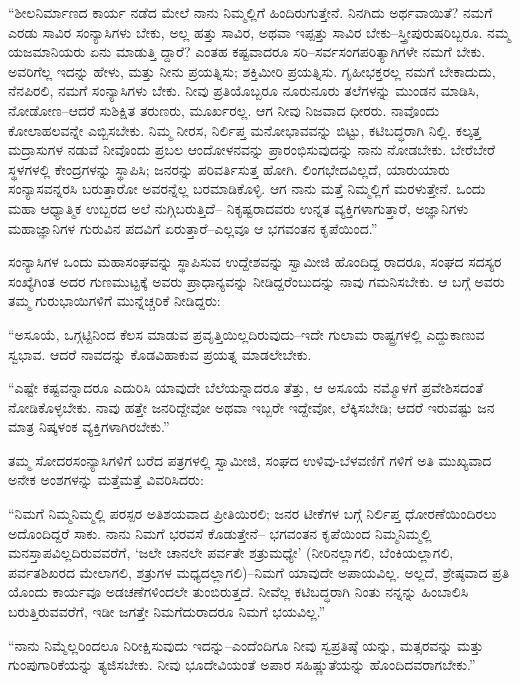 “ಶೀಲನಿರ್ಮಾಣದ ಕಾರ್ಯ ನಡೆದ ಮೇಲೆ ನಾನು ನಿಮ್ಮಲ್ಲಿಗೆ ಹಿಂದಿರುಗುತ್ತೇನೆ. ನಿನಗಿದು ಅರ್ಥವಾಯಿತೆ? ನಮಗೆ ಎರಡು ಸಾವಿರ ಸಂನ್ಯಾಸಿಗಳು ಬೇಕು, ಅಲ್ಲ ಹತ್ತು ಸಾವಿರ, ಅಥವಾ ಇಪ್ಪತ್ತು ಸಾವಿರ ಬೇಕು–ಸ್ತ್ರೀಪುರುಷರಿಬ್ಬರೂ. ನಮ್ಮ ಯಜಮಾನಿಯರು ಏನು ಮಾಡುತ್ತಿ ದ್ದಾರೆ? ಎಂತಹ ಕಷ್ಟವಾದರೂ ಸರಿ–ಸರ್ವಸಂಗಪರಿತ್ಯಾಗಿಗಳೇ ನಮಗೆ ಬೇಕು. ಅವರಿಗೆಲ್ಲ ಇದನ್ನು ಹೇಳು, ಮತ್ತು ನೀನು ಪ್ರಯತ್ನಿಸು; ಶಕ್ತಿಮೀರಿ ಪ್ರಯತ್ನಿಸು. ಗೃಹೀಭಕ್ತರಲ್ಲ ನಮಗೆ ಬೇಕಾದುದು, ನೆನಪಿರಲಿ, ನಮಗೆ ಸಂನ್ಯಾಸಿಗಳು ಬೇಕು. ನೀವು ಪ್ರತಿಯೊಬ್ಬರೂ ನೂರುನೂರು ತಲೆಗಳನ್ನು ಮುಂಡನ ಮಾಡಿಸಿ, ನೋಡೋಣ–ಆದರೆ ಸುಶಿಕ್ಷಿತ ತರುಣರು, ಮೂರ್ಖರಲ್ಲ. ಆಗ ನೀವು ನಿಜವಾದ ಧೀರರು. ನಾವೊಂದು ಕೋಲಾಹಲವನ್ನೇ ಎಬ್ಬಿಸಬೇಕು. ನಿಮ್ಮ ನೀರಸ, ನಿರ್ಲಿಪ್ತ ಮನೋಭಾವವನ್ನು ಬಿಟ್ಟು, ಕಟಿಬದ್ಧರಾಗಿ ನಿಲ್ಲಿ. ಕಲ್ಕತ್ತ ಮದ್ರಾಸುಗಳ ನಡುವೆ ನೀವೊಂದು ಪ್ರಬಲ ಆಂದೋಳನವನ್ನು ಪ್ರಾರಂಭಿಸುವುದನ್ನು ನಾನು ನೋಡಬೇಕು. ಬೇರೆಬೇರೆ ಸ್ಥಳಗಳಲ್ಲಿ ಕೇಂದ್ರಗಳನ್ನು ಸ್ಥಾಪಿಸಿ; ಜನರನ್ನು ಪರಿವರ್ತಿಸುತ್ತ ಹೋಗಿ. ಲಿಂಗಭೇದವಿಲ್ಲದೆ, ಯಾರುಯಾರು ಸಂನ್ಯಾಸವನ್ನರಸಿ ಬರುತ್ತಾರೋ ಅವರನ್ನೆಲ್ಲ ಬರಮಾಡಿಕೊಳ್ಳಿ. ಆಗ ನಾನು ಮತ್ತೆ ನಿಮ್ಮಲ್ಲಿಗೆ ಮರಳುತ್ತೇನೆ. ಒಂದು ಮಹಾ ಆಧ್ಯಾತ್ಮಿಕ ಉಬ್ಬರದ ಅಲೆ ನುಗ್ಗಿಬರುತ್ತಿದೆ– ನಿಕೃಷ್ಟರಾದವರು ಉನ್ನತ ವ್ಯಕ್ತಿಗಳಾಗುತ್ತಾರೆ, ಅಜ್ಞಾನಿಗಳು ಮಹಾಜ್ಞಾನಿಗಳ ಗುರುವಿನ ಪದವಿಗೆ ಏರುತ್ತಾರೆ–ಎಲ್ಲವೂ ಆ ಭಗವಂತನ ಕೃಪೆಯಿಂದ.”

ಸಂನ್ಯಾಸಿಗಳ ಒಂದು ಮಹಾಸಂಘವನ್ನು ಸ್ಥಾಪಿಸುವ ಉದ್ದೇಶವನ್ನು ಸ್ವಾಮೀಜಿ ಹೊಂದಿದ್ದ ರಾದರೂ, ಸಂಘದ ಸದಸ್ಯರ ಸಂಖ್ಯೆಗಿಂತ ಅದರ ಗುಣಮುಟ್ಟಕ್ಕೆ ಅವರು ಪ್ರಾಧಾನ್ಯವನ್ನು ನೀಡಿದ್ದರೆಂಬುದನ್ನು ನಾವು ಗಮನಿಸಬೇಕು. ಆ ಬಗ್ಗೆ ಅವರು ತಮ್ಮ ಗುರುಭಾಯಿಗಳಿಗೆ ಮುನ್ನೆಚ್ಚರಿಕೆ ನೀಡಿದ್ದರು:

“ಅಸೂಯೆ, ಒಗ್ಗಟ್ಟಿನಿಂದ ಕೆಲಸ ಮಾಡುವ ಪ್ರವೃತ್ತಿಯಿಲ್ಲದಿರುವುದು–ಇದೇ ಗುಲಾಮ ರಾಷ್ಟ್ರಗಳಲ್ಲಿ ಎದ್ದುಕಾಣುವ ಸ್ವಭಾವ. ಆದರೆ ನಾವದನ್ನು ಕೊಡವಿಹಾಕುವ ಪ್ರಯತ್ನ ಮಾಡಲೇಬೇಕು.

“ಎಷ್ಟೇ ಕಷ್ಟವನ್ನಾದರೂ ಎದುರಿಸಿ ಯಾವುದೇ ಬೆಲೆಯನ್ನಾದರೂ ತೆತ್ತು, ಆ ಅಸೂಯೆ ನಮ್ಮೊಳಗೆ ಪ್ರವೇಶಿಸದಂತೆ ನೋಡಿಕೊಳ್ಳಬೇಕು. ನಾವು ಹತ್ತೇ ಜನರಿದ್ದೇವೋ ಅಥವಾ ಇಬ್ಬರೇ ಇದ್ದೇವೋ, ಲೆಕ್ಕಿಸಬೇಡಿ; ಆದರೆ ಇರುವಷ್ಟು ಜನ ಮಾತ್ರ ನಿಷ್ಕಳಂಕ ವ್ಯಕ್ತಿಗಳಾಗಿರಬೇಕು.”

ತಮ್ಮ ಸೋದರಸಂನ್ಯಾಸಿಗಳಿಗೆ ಬರೆದ ಪತ್ರಗಳಲ್ಲಿ ಸ್ವಾಮೀಜಿ, ಸಂಘದ ಉಳಿವು-ಬೆಳವಣಿಗೆ ಗಳಿಗೆ ಅತಿ ಮುಖ್ಯವಾದ ಅನೇಕ ಅಂಶಗಳನ್ನು ಮತ್ತೆಮತ್ತೆ ವಿವರಿಸಿದರು:

“ನಿಮಗೆ ನಿಮ್ಮನಿಮ್ಮಲ್ಲಿ ಪರಸ್ಪರ ಅತಿಶಯವಾದ ಪ್ರೀತಿಯಿರಲಿ; ಜನರ ಟೀಕೆಗಳ ಬಗ್ಗೆ ನಿರ್ಲಿಪ್ತ ಧೋರಣೆಯಿಂದಿರಲು ಅದೊಂದಿದ್ದರೆ ಸಾಕು. ನಾನು ನಿಮಗೆ ಭರವಸೆ ಕೊಡುತ್ತೇನೆ– ಭಗವಂತನ ಕೃಪೆಯಿಂದ ನಿಮ್ಮನಿಮ್ಮಲ್ಲಿ ಮನಸ್ತಾಪವಿಲ್ಲದಿರುವವರೆಗೆ, ‘ಜಲೇ ಚಾನಲೇ ಪರ್ವತೇ ಶತ್ರುಮಧ್ಯೇ’ (ನೀರಿನಲ್ಲಾಗಲಿ, ಬೆಂಕಿಯಲ್ಲಾಗಲಿ, ಪರ್ವತಶಿಖರದ ಮೇಲಾಗಲಿ, ಶತ್ರುಗಳ ಮಧ್ಯದಲ್ಲಾಗಲಿ)–ನಿಮಗೆ ಯಾವುದೇ ಅಪಾಯವಿಲ್ಲ. ಅಲ್ಲದೆ, ಶ್ರೇಷ್ಠವಾದ ಪ್ರತಿ ಯೊಂದು ಕಾರ್ಯವೂ ಅಡಚಣೆಗಳಿಂದಲೇ ತುಂಬಿರುತ್ತದೆ. ನೀವೆಲ್ಲ ಕಟಿಬದ್ಧರಾಗಿ ನಿಂತು ನನ್ನನ್ನು ಹಿಂಬಾಲಿಸಿ ಬರುತ್ತಿರುವವರೆಗೆ, ಇಡೀ ಜಗತ್ತೇ ನಿಮಗೆದುರಾದರೂ ನಿಮಗೆ ಭಯವಿಲ್ಲ.”

“ನಾನು ನಿಮ್ಮೆಲ್ಲರಿಂದಲೂ ನಿರೀಕ್ಷಿಸುವುದು ಇದನ್ನು–ಎಂದೆಂದಿಗೂ ನೀವು ಸ್ವಪ್ರತಿಷ್ಠೆ ಯನ್ನು, ಮತ್ಸರವನ್ನು ಮತ್ತು ಗುಂಪುಗಾರಿಕೆಯನ್ನು ತ್ಯಜಿಸಬೇಕು. ನೀವು ಭೂದೇವಿಯಂತೆ ಅಪಾರ ಸಹಿಷ್ಣುತೆಯನ್ನು ಹೊಂದಿದವರಾಗಬೇಕು.”

